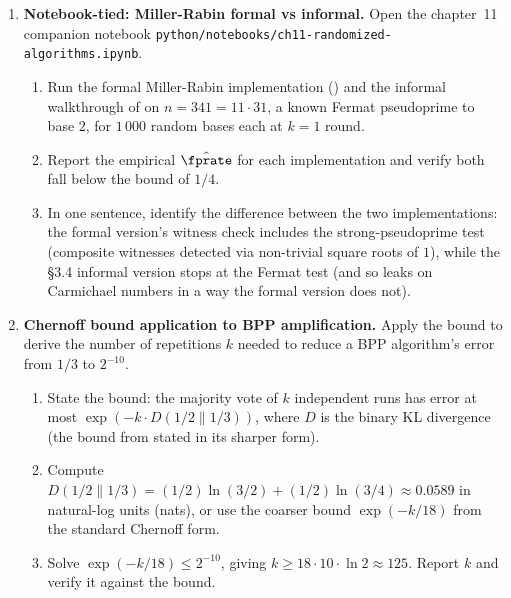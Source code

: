 \begin{enumerate}

\item \exstarstar
\label{ex:ch11-4}
\textbf{Notebook-tied: Miller-Rabin formal vs informal.}
Open the chapter~11 companion notebook
\texttt{python/notebooks/ch11-randomized-algorithms.ipynb}.
\begin{enumerate}
  \item[(a)] Run the formal Miller-Rabin implementation
    () and the informal walkthrough
    of  on $n = 341 = 11 \cdot 31$, a known
    Fermat pseudoprime to base $2$, for $1\,000$ random bases each
    at $k = 1$ round.
  \item[(b)] Report the empirical $\hat{\fprate}$ for each
    implementation and verify both fall below the
     bound of $1/4$.
  \item[(c)] In one sentence, identify the difference between the
    two implementations: the formal version's witness check
    includes the strong-pseudoprime test (composite witnesses
    detected via non-trivial square roots of $1$), while the
    \S3.4 informal version stops at the Fermat test (and so leaks
    on Carmichael numbers in a way the formal version does not).
\end{enumerate}

\item \exstarstar
\label{ex:ch11-5}
\textbf{Chernoff bound application to BPP amplification.}
Apply the  bound to derive the number
of repetitions $k$ needed to reduce a BPP algorithm's error from
$1/3$ to $2^{-10}$.
\begin{enumerate}
  \item[(a)] State the bound: the majority vote of $k$ independent
    runs has error at most $\exp(-k \cdot D(1/2 \| 1/3))$, where
    $D$ is the binary KL divergence (the bound from
     stated in its sharper form).
  \item[(b)] Compute $D(1/2 \| 1/3) = (1/2) \ln(3/2) +
    (1/2) \ln(3/4) \approx 0.0589$ in natural-log units (nats),
    or use the coarser bound $\exp(-k/18)$ from the standard
    Chernoff form.
  \item[(c)] Solve $\exp(-k/18) \le 2^{-10}$, giving $k \ge 18
    \cdot 10 \cdot \ln 2 \approx 125$. Report $k$ and verify it
    against the bound.
\end{enumerate}


\end{enumerate}
